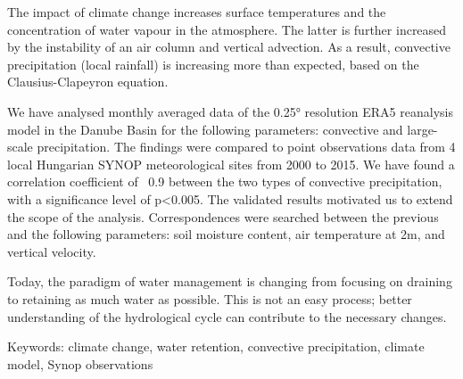 \noindent

The impact of climate change increases surface temperatures and the concentration of water vapour in the atmosphere. The latter is further increased by the instability of an air column and vertical advection. As a result, convective precipitation (local rainfall) is increasing more than expected, based on the Clausius-Clapeyron equation. 

We have analysed monthly averaged data of the 0.25° resolution ERA5 reanalysis model in the Danube Basin for the following parameters: convective and large-scale precipitation. The findings were compared to point observations data from 4 local Hungarian SYNOP meteorological sites from 2000 to 2015. We have found a correlation coefficient of ~0.9 between the two types of convective precipitation, with a significance level of p<0.005. The validated results motivated us to extend the scope of the analysis. Correspondences were searched between the previous and the following parameters: soil moisture content, air temperature at 2m, and vertical velocity.

Today, the paradigm of water management is changing from focusing on draining to retaining as much water as possible. This is not an easy process; better understanding of the hydrological cycle can contribute to the necessary changes.

Keywords: climate change, water retention, convective precipitation, climate model, Synop observations
\newpage{}
{}
\begin{flushleft}






\end{flushleft}

